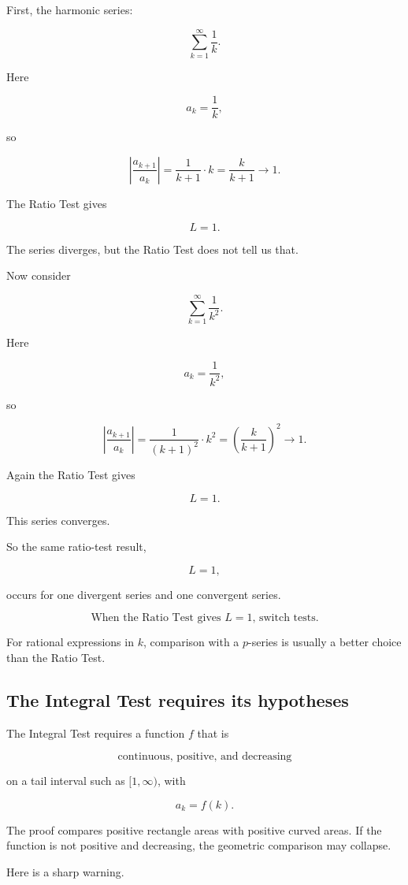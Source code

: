 First, the harmonic series:

\[
\sum_{k=1}^{\infty}\frac1k.
\]

Here

\[
a_k=\frac1k,
\]

so

\[
\left|\frac{a_{k+1}}{a_k}\right|
=
\frac{1}{k+1}\cdot k
=
\frac{k}{k+1}
\to1.
\]

The Ratio Test gives

\[
L=1.
\]

The series diverges, but the Ratio Test does not tell us that.

Now consider

\[
\sum_{k=1}^{\infty}\frac1{k^2}.
\]

Here

\[
a_k=\frac1{k^2},
\]

so

\[
\left|\frac{a_{k+1}}{a_k}\right|
=
\frac{1}{(k+1)^2}\cdot k^2
=
\left(\frac{k}{k+1}\right)^2
\to1.
\]

Again the Ratio Test gives

\[
L=1.
\]

This series converges.

So the same ratio-test result,

\[
L=1,
\]

occurs for one divergent series and one convergent series.

\[
\boxed{
\text{When the Ratio Test gives \(L=1\), switch tests.}
}
\]

For rational expressions in \(k\), comparison with a \(p\)-series is usually a better
choice than the Ratio Test.

\subsection{The Integral Test requires its hypotheses}
\label{subsec:warning-integral-test-hypotheses}

The Integral Test requires a function \(f\) that is

\[
\text{continuous, positive, and decreasing}
\]

on a tail interval such as \([1,\infty)\), with

\[
a_k=f(k).
\]

The proof compares positive rectangle areas with positive curved areas.  If the function
is not positive and decreasing, the geometric comparison may collapse.

Here is a sharp warning.

